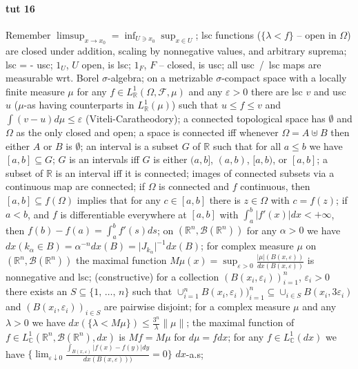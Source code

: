 \documentclass[a4paper]{article}
\newcommand{\Fcal}{\mathcal{F}}
\newcommand{\Bcal}{\mathcal{B}}
\newcommand{\real}{\mathbb{R}}
\newcommand{\cplx}{\mathbb{C}}
\begin{document}


\paragraph{tut 16} %
\label{par:tut_16}

Remember $\limsup_{x\to x_0} = \inf_{U\ni x_0} \sup_{x\in U}$;
lsc functions ($\{\lambda < f\}$ -- open in $\Omega$) are closed under addition, scaling by nonnegative values, and arbitrary suprema;
lsc = - usc;
$1_U$, $U$ open, is lsc;
$1_F$, $F$ -- closed, is usc;
all usc~/~lsc maps are measurable wrt. Borel $\sigma$-algebra;
on a metrizable $\sigma$-compact space with a locally finite measure $\mu$ for any $f \in L^1_\real(\Omega, \Fcal, \mu)$ and any $\varepsilon > 0$ there are lsc $v$ and usc $u$ ($\mu$-as having counterparts in $L^1_\real(\mu)$) such that $u \leq f \leq v$ and $\int (v - u) d\mu \leq \varepsilon$ (Viteli-Caratheodory);
a connected topological space has $\emptyset$ and $\Omega$ as the only closed and open;
a space is connected iff whenever $\Omega = A \uplus B$ then either $A$ or $B$ is $\emptyset$;
an interval is a subset $G$ of $\real$ such that for all $a \leq b$ we have $[a, b] \subseteq G$;
$G$ is an intervals iff $G$ is either $(a, b]$, $(a, b)$, $[a, b)$, or $[a, b]$;
a subset of $\real$ is an interval iff it is connected;
images of connected subsets via a continuous map are connected;
if $\Omega$ is connected and $f$ continuous, then $[a, b] \subseteq f(\Omega)$ implies that for any $c \in [a, b]$ there is $z \in \Omega$ with $c = f(z)$;
if $a < b$, and $f$ is differentiable everywhere at $[a, b]$ with $\int_a^b | f'(x)| dx < + \infty$, then $f(b) - f(a) = \int_a^b f'(s) ds$;
on $(\real^n, \Bcal(\real^n))$ for any $\alpha > 0$ we have $dx({k_\alpha \in B}) = \alpha^{-n} dx(B) = \lvert J_{k_\alpha} \rvert^{-1} dx(B)$;
for complex measure $\mu$ on $(\real^n, \Bcal(\real^n))$ the maximal function $M\mu(x) = \sup_{\varepsilon>0} \tfrac{|\mu|(B(x,\varepsilon))}{dx(B(x,\varepsilon))}$ is nonnegative and lsc;
(constructive) for a collection $(B(x_i,\varepsilon_i))_{i=1}^n$, $\varepsilon_i > 0$ there exists an $S \subseteq \{1,\,\ldots,\,n\}$ such that $\cup_{i=1}^n B(x_i,\varepsilon_i))_{i=1}^n \subseteq \cup_{i\in S} B(x_i, 3\varepsilon_i)$ and $(B(x_i,\varepsilon_i))_{i\in S}$ are pairwise disjoint;
for a complex measure $\mu$ and any $\lambda > 0$ we have $dx(\{\lambda < M\mu\}) \leq \tfrac{3^n}{\lambda} \|\mu\|$;
the maximal function of $f \in L^1_\cplx(\real^n, \Bcal(\real^n), dx)$ is $M f = M \mu$ for $d\mu = f dx$;
for any $f \in L^1_\cplx(dx)$ we have $\bigl\{\lim_{\varepsilon \downarrow 0} \tfrac{\int_{B(x, \varepsilon)} |f(x) - f(y)| dy}{dx(B(x, \varepsilon)))} = 0\bigr\}$ $dx$-a.s;
\end{document}
